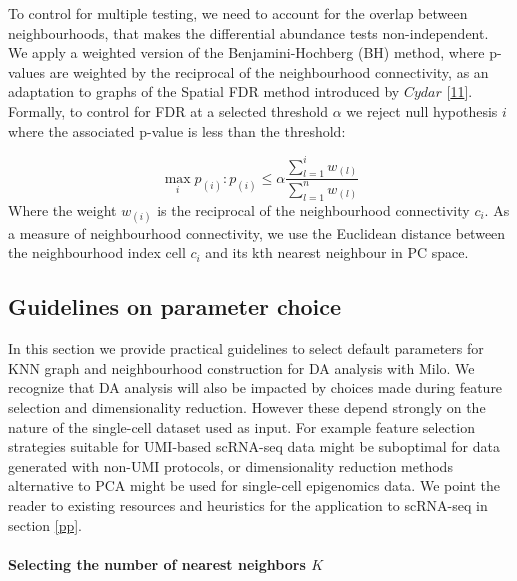 \documentclass[
]{article}
\begin{document}
To control for multiple testing, we need to account for the overlap between neighbourhoods, that makes the differential abundance tests non-independent. We apply a weighted version of the Benjamini-Hochberg (BH) method, where p-values are weighted by the reciprocal of the neighbourhood connectivity, as an adaptation to graphs of the Spatial FDR method introduced by \(Cydar\) {[}\protect\hyperlink{ref-lunTestingDifferentialAbundance2017}{11}{]}.
Formally, to control for FDR at a selected threshold \(\alpha\) we reject null hypothesis \(i\) where the associated p-value is less than the threshold:

\[
\max_i{p_{(i)}: p_{(i)}\le \alpha\frac{\sum_{l=1}^{i}w_{(l)}}{\sum_{l=1}^{n}w_{(l)}}}
\]
Where the weight \(w_{(i)}\) is the reciprocal of the neighbourhood connectivity \(c_i\). As a measure of neighbourhood connectivity, we use the Euclidean distance between the neighbourhood index cell \(c_i\) and its kth nearest neighbour in PC space.

\hypertarget{guidelines-on-parameter-choice}{%
\subsection{Guidelines on parameter choice}\label{guidelines-on-parameter-choice}}

In this section we provide practical guidelines to select default parameters for KNN graph and neighbourhood construction for DA analysis with Milo. We recognize that DA analysis will also be impacted by choices made during feature selection and dimensionality reduction. However these depend strongly on the nature of the single-cell dataset used as input. For example feature selection strategies suitable for UMI-based scRNA-seq data might be suboptimal for data generated with non-UMI protocols, or dimensionality reduction methods alternative to PCA might be used for single-cell epigenomics data. We point the reader to existing resources and heuristics for the application to scRNA-seq in section \ref{pp}.

\hypertarget{selecting-the-number-of-nearest-neighbors-k}{%
\paragraph*{\texorpdfstring{Selecting the number of nearest neighbors \(K\)}{Selecting the number of nearest neighbors K}}\label{selecting-the-number-of-nearest-neighbors-k}}
\end{document}
